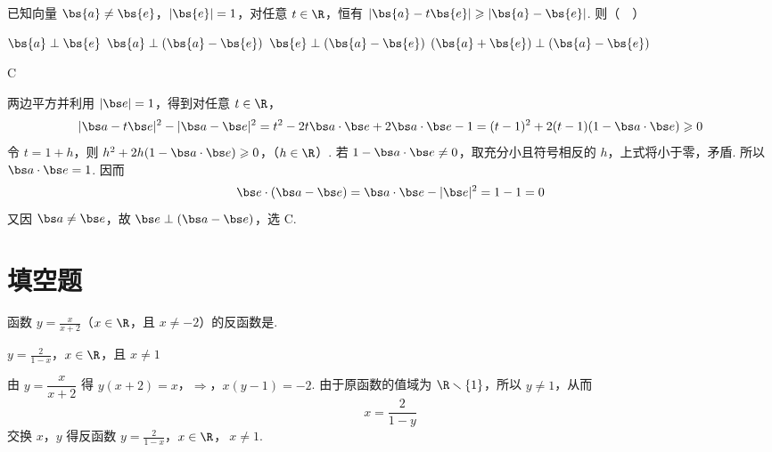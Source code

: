 \begin{problem}
已知向量 \(\bs{a} \neq \bs{e}\)，\(|\bs{e}| = 1\)，对任意 \(t \in \R\)，恒有 \(|\bs{a} - t\bs{e}| \geqslant |\bs{a} - \bs{e}|\). 则（\(\quad\)）

\choices
    {\(\bs{a} \perp \bs{e}\)}
    {\(\bs{a} \perp (\bs{a} - \bs{e})\)}
    {\(\bs{e} \perp (\bs{a} - \bs{e})\)}
    {\((\bs{a} + \bs{e}) \perp (\bs{a} - \bs{e})\)}

\begin{answer}
C
\end{answer}

\begin{solution}
两边平方并利用 \(|\bs e|=1\)，得到对任意 \(t\in\R\)，
\[
|\bs a-t\bs e|^2-|\bs a-\bs e|^2
=t^2-2t\bs a\cdot\bs e+2\bs a\cdot\bs e-1
=(t-1)^2+2(t-1)(1-\bs a\cdot\bs e)\geqslant0
\]
令 \(t=1+h\)，则
\(h^2+2h(1-\bs a\cdot\bs e)\geqslant0\)，（\(h\in\R\)）.
若 \(1-\bs a\cdot\bs e\ne0\)，取充分小且符号相反的 \(h\)，上式将小于零，矛盾. 所以
\(\bs a\cdot\bs e=1\). 因而
\[
\bs e\cdot(\bs a-\bs e)=\bs a\cdot\bs e-|\bs e|^2=1-1=0
\]
又因 \(\bs a\ne\bs e\)，故 \(\bs e\perp(\bs a-\bs e)\)，选 C.
\end{solution}
\end{problem}

\section{填空题}
\begin{problem}
函数 \( y = \frac{x}{x + 2} \)（\(x \in \R\)，且 \(x \neq -2\)）的反函数是\fillinblank{}.

\begin{answer}
\(y=\frac{2}{1-x}\)，\(x\in\R\)，且 \(x\neq1\)
\end{answer}

\begin{solution}
由 \(y=\dfrac{x}{x+2}\) 得
\(y(x+2)=x\)，\(\Longrightarrow\)，\(x(y-1)=-2\).
由于原函数的值域为 \(\R\smallsetminus\{1\}\)，所以 \(y\ne1\)，从而
\[
x=\frac{2}{1-y}
\]
交换 \(x\)，\(y\) 得反函数
\(y=\frac{2}{1-x}\)，\(x\in\R\)，\(\ x\ne1\).
\end{solution}
\end{problem}

